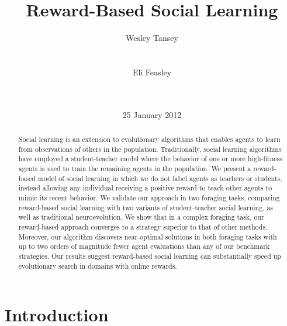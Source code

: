 \documentclass{acm_proc_article-sp}
\begin{document}
\title{Reward-Based Social Learning}

\author{
\alignauthor
Wesley Tansey\\
       \\
       \\
\alignauthor
Eli Feasley\\
       \\
       \\
}
\date{25 January 2012}

\maketitle
\begin{abstract}
Social learning is an extension to evolutionary algorithms that enables agents to learn from observations of others in the population. Traditionally, social learning algorithms have employed a student-teacher model where the behavior of one or more high-fitness agents is used to train the remaining agents in the population. We present a reward-based model of social learning in which we do not label agents as teachers or students, instead allowing any individual receiving a positive reward to teach other agents to mimic its recent behavior. We validate our approach in two foraging tasks, comparing reward-based social learning with two variants of student-teacher social learning, as well as traditional neuroevolution. We show that in a complex foraging task, our reward-based approach converges to a strategy superior to that of other methods. Moreover, our algorithm discovers near-optimal solutions in both foraging tasks with up to two orders of magnitude fewer agent evaluations than any of our benchmark strategies. Our results suggest reward-based social learning can substantially speed up evolutionary search in domains with online rewards.
\end{abstract}


\section{Introduction}
\end{document}
